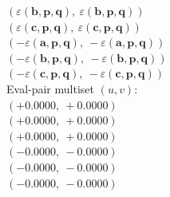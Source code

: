 \documentclass[a4paper,11pt]{article}
\newcommand{\kblbmcpggoncpf}[3]{\varepsilon(\mathbf{#1},\mathbf{#2},\mathbf{#3})}
\begin{document}
$(\kblbmcpggoncpf{b}{p}{q},\ \kblbmcpggoncpf{b}{p}{q})$\\
$(\kblbmcpggoncpf{c}{p}{q},\ \kblbmcpggoncpf{c}{p}{q})$\\
$(-\kblbmcpggoncpf{a}{p}{q},\ -\kblbmcpggoncpf{a}{p}{q})$\\
$(-\kblbmcpggoncpf{b}{p}{q},\ -\kblbmcpggoncpf{b}{p}{q})$\\
$(-\kblbmcpggoncpf{c}{p}{q},\ -\kblbmcpggoncpf{c}{p}{q})$\\
\quad Eval-pair multiset $(u, v)$:\\
$(+0.0000,\ +0.0000)$\\
$(+0.0000,\ +0.0000)$\\
$(+0.0000,\ +0.0000)$\\
$(-0.0000,\ -0.0000)$\\
$(-0.0000,\ -0.0000)$\\
$(-0.0000,\ -0.0000)$\\
\end{document}
